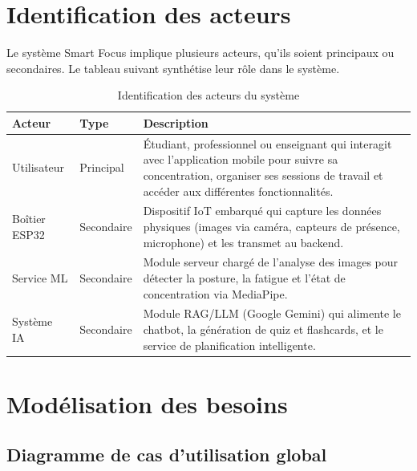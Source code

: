 \documentclass[12pt,a4paper]{report}
\begin{document}
\section{Identification des acteurs}

Le système Smart Focus implique plusieurs acteurs, qu'ils soient principaux ou secondaires. Le tableau suivant synthétise leur rôle dans le système.

\begin{table}[H]
    \centering
    \caption{Identification des acteurs du système}
    \label{tab:acteurs}
    \renewcommand{\arraystretch}{1.3}
    \begin{tabular}{|l|l|p{8cm}|}
        \hline
        \textbf{Acteur} & \textbf{Type} & \textbf{Description} \\
        \hline
        Utilisateur & Principal & Étudiant, professionnel ou enseignant qui interagit avec l'application mobile pour suivre sa concentration, organiser ses sessions de travail et accéder aux différentes fonctionnalités. \\
        \hline
        Boîtier ESP32 & Secondaire & Dispositif \ac{IoT} embarqué qui capture les données physiques (images via caméra, capteurs de présence, microphone) et les transmet au backend. \\
        \hline
        Service ML & Secondaire & Module serveur chargé de l'analyse des images pour détecter la posture, la fatigue et l'état de concentration via MediaPipe. \\
        \hline
        Système \ac{IA} & Secondaire & Module \ac{RAG}/\ac{LLM} (Google Gemini) qui alimente le chatbot, la génération de quiz et flashcards, et le service de planification intelligente. \\
        \hline
    \end{tabular}
\end{table}

\section{Modélisation des besoins}

\subsection{Diagramme de cas d'utilisation global}
\end{document}
